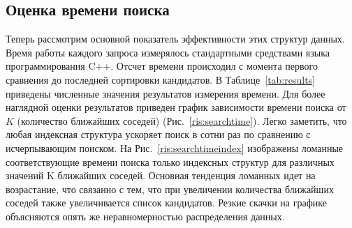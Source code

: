 \subsection{Оценка времени поиска}

Теперь рассмотрим основной показатель эффективности этих структур данных. Время работы каждого запроса измерялось стандартными средствами языка программирования C++. Отсчет времени происходил с момента первого сравнения до последней сортировки кандидатов. В Таблице~\ref{tab:results} приведены численные значения результатов измерения времени. Для более наглядной оценки результатов приведен график зависимости времени поиска от $K$ (количество ближайших соседей) (Рис.~\ref{ris:searchtime}). Легко заметить, что любая индексная структура ускоряет поиск в сотни раз по сравнению с исчерпывающим поиском. На Рис.~\ref{ris:searchtimeindex} изображены ломанные соответствующие времени поиска только индексных структур для различных значений K ближайших соседей. Основная тенденция ломанных идет на возрастание, что связанно с тем, что при увеличении количества ближайших соседей также увеличивается список кандидатов. Резкие скачки на графике объясняются опять же неравномерностью распределения данных.